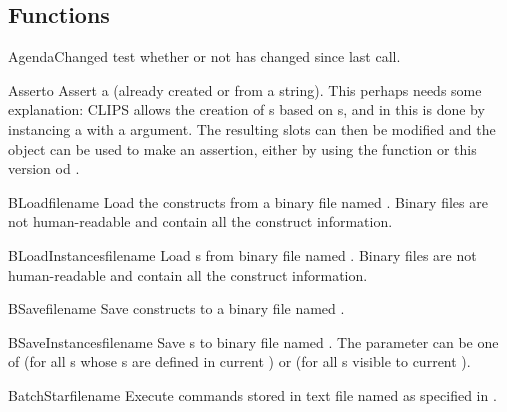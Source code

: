 \subsection{Functions\label{pyclips-tl-functions}}

\begin{funcdesc}{AgendaChanged}{}
test whether or not  has changed since last call.
\end{funcdesc}

\begin{funcdesc}{Assert}{o}
Assert a  (already created or from a string). This perhaps
needs some explanation: CLIPS allows the creation of s based
on s, and in \pyclips{} this is done by instancing a
 with a  argument. The resulting 
slots can then be modified and the object can be used to make an
assertion, either by using the  
function or this version od .
\end{funcdesc}

\begin{funcdesc}{BLoad}{filename}
Load the constructs from a binary file named . Binary
files are not human-readable and contain all the construct information.
\end{funcdesc}

\begin{funcdesc}{BLoadInstances}{filename}
Load s from binary file named . Binary
files are not human-readable and contain all the construct information.
\end{funcdesc}

\begin{funcdesc}{BSave}{filename}
Save constructs to a binary file named .
\end{funcdesc}

\begin{funcdesc}{BSaveInstances}{filename }
Save s to binary file named . The
 parameter can be one of  (for all
s whose s are defined in current
) or  (for all s
visible to current ).
\end{funcdesc}

\begin{funcdesc}{BatchStar}{filename}
Execute commands stored in text file named as specified in .
\end{funcdesc}

